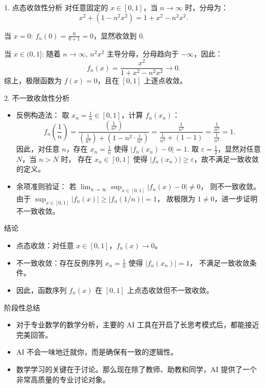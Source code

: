 \documentclass{beamer}
\begin{document}
\begin{frame}{1. 点态收敛性分析}
对任意固定的 $x \in [0,1]$，当 $n \to \infty$ 时，分母为：
$$
x^2 + (1 - n^2x^2) = 1 + x^2 - n^2x^2.
$$

当 $x = 0$: $f_n(0) = \frac{0}{0 + 1} = 0$，显然收敛到 $0$.

当 $x \in (0,1]$: 随着 $n \to \infty$, $n^2x^2$ 主导分母，分母趋向于 $-\infty$，因此：
  $$
  f_n(x) = \frac{x^2}{1 + x^2 - n^2x^2} \to 0.
  $$
综上，极限函数为 $f(x) = 0$，且在 $[0,1]$ 上逐点收敛。
\end{frame}

\begin{frame}{2. 不一致收敛性分析}
\begin{itemize}
  \item<1-> 反例构造法： 取 $x_n = \frac{1}{n} \in [0,1]$，计算 $f_n(x_n)$：
$$
f_n\left(\frac{1}{n}\right) 
= \frac{\left(\frac{1}{n^2}\right)}{\left(\frac{1}{n^2}\right) + \left(1 - n^2 \cdot \frac{1}{n^2}\right)} = \frac{\frac{1}{n^2}}{\frac{1}{n^2} + (1 - 1)} 
= \frac{\frac{1}{n^2}}{\frac{1}{n^2}} 
= 1.
$$
因此，对任意 $n$，存在 $x_n = \frac{1}{n}$ 使得 $|f_n(x_n) - 0| = 1$. 
取 $\varepsilon = \frac{1}{2}$，显然对任意 $N$，当 $n > N$ 时，
存在 $x_n \in [0,1]$ 使得 $|f_n(x_n)| \geq \varepsilon$，故不满足一致收敛的定义。
\item<2-> 余项准则验证： 若 $\lim_{n \to \infty} \sup_{x \in [0,1]} |f_n(x) - 0| \neq 0$，
则不一致收敛。 由于 $\sup_{x \in [0,1]} |f_n(x)| \geq |f_n(1/n)| = 1$，
故极限为 $1 \neq 0$，进一步证明不一致收敛。
\end{itemize}
\end{frame}

\begin{frame}{结论}
\begin{itemize}
  \item<1-> 点态收敛：对任意 $x \in [0,1]$，$f_n(x) \to 0$。
  \item<2-> 不一致收敛：存在反例序列 $x_n = \frac{1}{n}$ 使得 $|f_n(x_n)| = 1$，
  不满足一致收敛条件。
  \item<3-> 因此，函数序列 $f_n(x)$ 在 $[0,1]$ 上点态收敛但不一致收敛。
\end{itemize}
\end{frame}

\begin{frame}{阶段性总结}
  \begin{itemize}
    \item<1-> 对于专业数学的数学分析，主要的 AI 工具在开启了长思考模式后，都能接近完美回答。
    \item<2-> AI 不会一味地迁就你，而是确保有一致的逻辑性。 
    \item<3-> 数学学习的关键在于讨论。那么现在除了教师、助教和同学，AI 提供了一个非常高质量的专业讨论对象。
  \end{itemize}
\end{frame}
\end{document}
